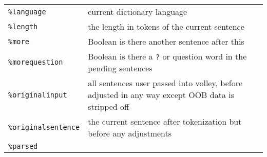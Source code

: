 \documentclass[]{article}
\begin{document}
\begin{longtable}[]{@{}ll@{}}
\begin{minipage}[t]{0.26\columnwidth}
\texttt{\%language}\strut
\end{minipage} & \begin{minipage}[t]{0.10\columnwidth}\raggedright\strut
current dictionary language\strut
\end{minipage}\tabularnewline
\begin{minipage}[t]{0.26\columnwidth}\raggedright\strut
\texttt{\%length}\strut
\end{minipage} & \begin{minipage}[t]{0.10\columnwidth}\raggedright\strut
the length in tokens of the current sentence\strut
\end{minipage}\tabularnewline
\begin{minipage}[t]{0.26\columnwidth}\raggedright\strut
\texttt{\%more}\strut
\end{minipage} & \begin{minipage}[t]{0.10\columnwidth}\raggedright\strut
Boolean is there another sentence after this\strut
\end{minipage}\tabularnewline
\begin{minipage}[t]{0.26\columnwidth}\raggedright\strut
\texttt{\%morequestion}\strut
\end{minipage} & \begin{minipage}[t]{0.10\columnwidth}\raggedright\strut
Boolean is there a \texttt{?} or question word in the pending
sentences\strut
\end{minipage}\tabularnewline
\begin{minipage}[t]{0.26\columnwidth}\raggedright\strut
\texttt{\%originalinput}\strut
\end{minipage} & \begin{minipage}[t]{0.10\columnwidth}\raggedright\strut
all sentences user passed into volley, before adjusted in any way except
OOB data is stripped off\strut
\end{minipage}\tabularnewline
\begin{minipage}[t]{0.26\columnwidth}\raggedright\strut
\texttt{\%originalsentence}\strut
\end{minipage} & \begin{minipage}[t]{0.10\columnwidth}\raggedright\strut
the current sentence after tokenization but before any adjustments\strut
\end{minipage}\tabularnewline
\begin{minipage}[t]{0.26\columnwidth}\raggedright\strut
\texttt{\%parsed}\strut
\end{minipage} & \begin{minipage}[t]{0.10\columnwidth}\raggedright\strut

\end{minipage}
\end{longtable}
\end{document}
